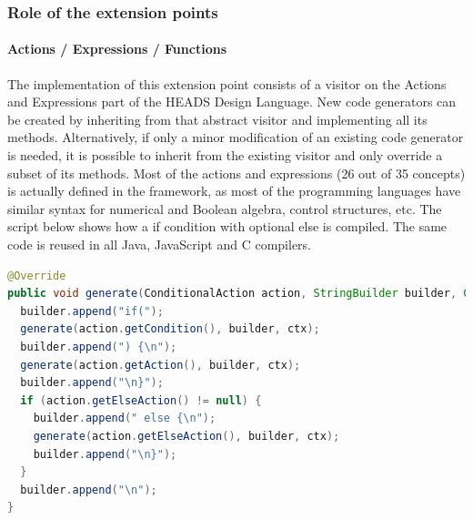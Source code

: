 \subsubsection{Role of the extension points}

\paragraph{Actions / Expressions / Functions }


The implementation of this extension point consists of a visitor on the Actions and Expressions part of the HEADS Design Language. New code generators can be created by inheriting from that abstract visitor and implementing all its methods. Alternatively, if only a minor modification of an existing code generator is needed, it is possible to inherit from the existing visitor and only override a subset of its methods. Most of the actions and expressions (26 out of 35 concepts) is actually defined in the framework, as most of the programming languages have similar syntax for numerical and Boolean algebra, control structures, etc. The script below shows how a if  condition with optional else is compiled. The same code is reused in all Java, JavaScript and C compilers. 

\begin{lstlisting}[language=Java]
@Override 
public void generate(ConditionalAction action, StringBuilder builder, Context ctx) { 
  builder.append("if("); 
  generate(action.getCondition(), builder, ctx); 
  builder.append(") {\n"); 
  generate(action.getAction(), builder, ctx); 
  builder.append("\n}"); 
  if (action.getElseAction() != null) { 
    builder.append(" else {\n"); 
    generate(action.getElseAction(), builder, ctx); 
    builder.append("\n}"); 
  } 
  builder.append("\n"); 
} 
\end{lstlisting}

